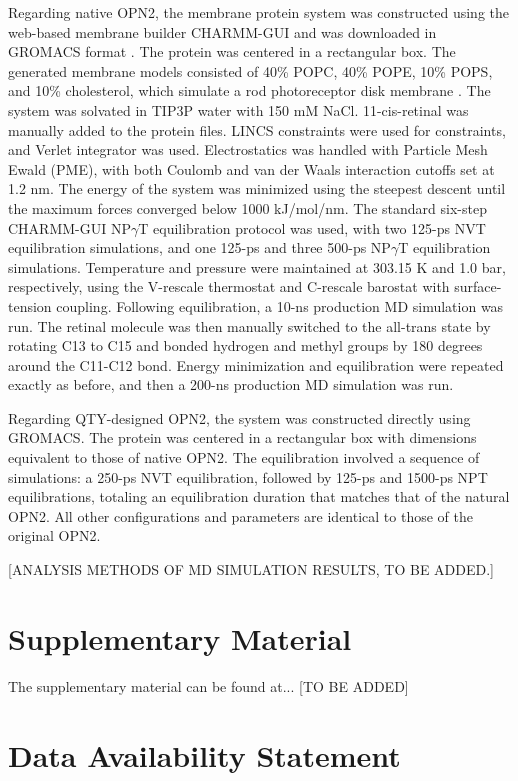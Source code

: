 \documentclass[fleqn,10pt,lineno]{manuscript}
\begin{document}
Regarding native OPN2, the membrane protein system was constructed using the web-based membrane builder CHARMM-GUI and was downloaded in GROMACS format \citep{Jo_2008, Wu_2014, Lee_2016}. The protein was centered in a rectangular box. The generated membrane models consisted of 40\% POPC, 40\% POPE, 10\% POPS, and 10\% cholesterol, which simulate a rod photoreceptor disk membrane \citep{Albert_2005}. The system was solvated in TIP3P water with 150 mM NaCl. 11-cis-retinal was manually added to the protein files. LINCS constraints were used for constraints, and Verlet integrator was used. Electrostatics was handled with Particle Mesh Ewald (PME), with both Coulomb and van der Waals interaction cutoffs set at 1.2 nm. The energy of the system was minimized using the steepest descent until the maximum forces converged below 1000 kJ/mol/nm. The standard six-step CHARMM-GUI NP$\gamma$T equilibration protocol \citep{Jo_2008} was used, with two 125-ps NVT equilibration simulations, and one 125-ps and three 500-ps NP$\gamma$T equilibration simulations. Temperature and pressure were maintained at 303.15 K and 1.0 bar, respectively, using the V-rescale thermostat and C-rescale barostat with surface-tension coupling. Following equilibration, a 10-ns production MD simulation was run. The retinal molecule was then manually switched to the all-trans state by rotating C13 to C15 and bonded hydrogen and methyl groups by 180 degrees around the C11-C12 bond. Energy minimization and equilibration were repeated exactly as before, and then a 200-ns production MD simulation was run. 

Regarding QTY-designed OPN2, the system was constructed directly using GROMACS. The protein was centered in a rectangular box with dimensions equivalent to those of native OPN2. The equilibration involved a sequence of simulations: a 250-ps NVT equilibration, followed by 125-ps and 1500-ps NPT equilibrations, totaling an equilibration duration that matches that of the natural OPN2. All other configurations and parameters are identical to those of the original OPN2.

[ANALYSIS METHODS OF MD SIMULATION RESULTS, TO BE ADDED.]

\section*{Supplementary Material}

The supplementary material can be found at... [TO BE ADDED]

\section*{Data Availability Statement} 
\end{document}
